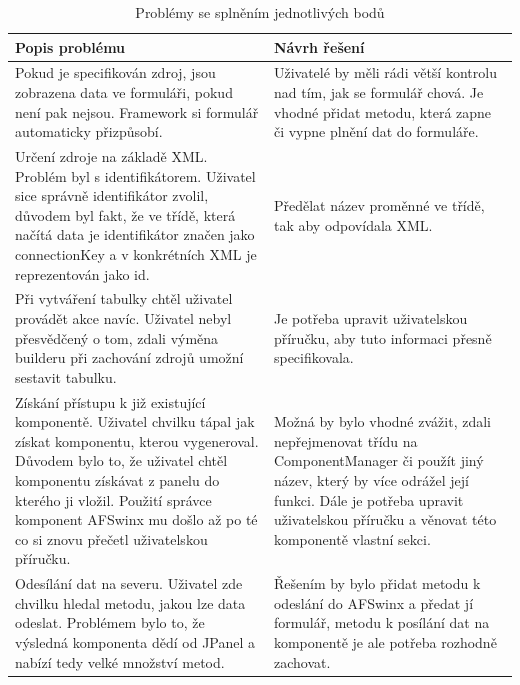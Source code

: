 \begin{table}[width=\linewidth]
\begin{center}
\caption{Problémy se splněním jednotlivých bodů}
\label{table:userTestResult}
\begin{tabular}{|p{7cm}|p{7cm}|}
\hline
\textbf{Popis problému} & \textbf{Návrh řešení} \\
\hline
Pokud je specifikován zdroj, jsou zobrazena data ve formuláři, pokud není pak nejsou. Framework si formulář automaticky přizpůsobí. & 
Uživatelé by měli rádi větší kontrolu nad tím, jak se formulář chová. Je vhodné přidat metodu, která zapne či vypne plnění dat do formuláře. \\
\hline
Určení zdroje na základě XML. Problém byl s identifikátorem. Uživatel sice správně identifikátor zvolil, důvodem byl fakt, že ve třídě, která načítá data je identifikátor značen jako connectionKey a v konkrétních XML je reprezentován jako id. & 
Předělat název proměnné ve třídě, tak aby odpovídala XML. \\
\hline
Při vytváření tabulky chtěl uživatel provádět akce navíc. Uživatel nebyl přesvědčený o tom, zdali výměna builderu při zachování zdrojů umožní sestavit tabulku. & Je potřeba upravit uživatelskou příručku, aby tuto informaci přesně specifikovala. \\
\hline
Získání přístupu k již existující komponentě. Uživatel chvilku tápal jak získat komponentu, kterou vygeneroval. Důvodem bylo to, že uživatel chtěl komponentu získávat z panelu do kterého ji vložil. Použití správce komponent AFSwinx mu došlo až po té co si znovu přečetl uživatelskou příručku. & Možná by bylo vhodné zvážit, zdali nepřejmenovat třídu na ComponentManager či použít jiný název, který by více odrážel její funkci. Dále je potřeba upravit uživatelskou příručku a věnovat této komponentě vlastní sekci. \\
\hline
Odesílání dat na severu. Uživatel zde chvilku hledal metodu, jakou lze data odeslat. Problémem bylo to, že výsledná komponenta dědí od JPanel a nabízí tedy velké množství metod. & Řešením by bylo přidat metodu k odeslání do AFSwinx a předat jí formulář, metodu k posílání dat na komponentě je ale potřeba rozhodně zachovat. \\
\hline
\end{tabular}
\end{center}
\end{table}
